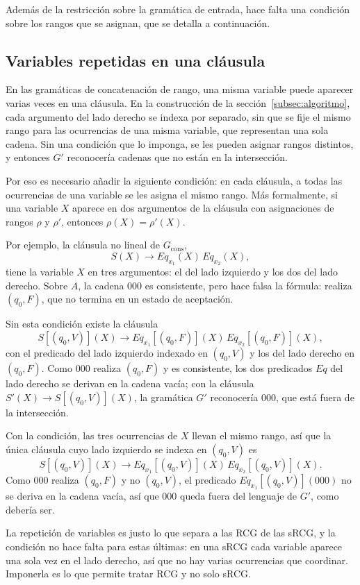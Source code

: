 \documentclass{report}
\theoremstyle{definition}
\theoremstyle{plain}
\begin{document}
Además de la restricción sobre la gramática de entrada, hace falta una
condición sobre los rangos que se asignan, que se detalla a
continuación.

\subsection{Variables repetidas en una cláusula}

En las gramáticas de concatenación de rango, una misma variable puede
aparecer varias veces en una cláusula. En la construcción de la
sección~\ref{subsec:algoritmo}, cada argumento del lado derecho se indexa por
separado,
sin que se fije el mismo rango para las ocurrencias de una misma
variable, que representan una sola cadena.
Sin una condición que lo imponga, se les pueden asignar rangos
distintos, y entonces $G'$ reconocería cadenas que no están en la
intersección.

Por eso es necesario añadir la siguiente condición: en cada cláusula,
a todas las ocurrencias de una variable se les asigna el mismo rango.
Más formalmente, si una variable $X$ aparece en dos argumentos de la
cláusula con asignaciones de rangos $\rho$ y $\rho'$, entonces
$\rho(X) = \rho'(X)$.

Por ejemplo, la cláusula no lineal de $G_{\mathrm{cons}}$,
\[
  S(X) \to Eq_{x_1}(X)\, Eq_{x_2}(X),
\]
tiene la variable $X$ en tres argumentos: el del lado izquierdo y los
dos del lado derecho. Sobre $A$, la cadena $000$ es consistente, pero
hace falsa la fórmula: realiza $(q_0, F)$, que no termina en un estado
de aceptación.

Sin esta condición existe la cláusula
\[
  S[(q_0, V)](X) \to Eq_{x_1}[(q_0, F)](X)\, Eq_{x_2}[(q_0, F)](X),
\]
con el predicado del lado izquierdo indexado en $(q_0, V)$ y los del
lado derecho en $(q_0, F)$. Como $000$ realiza $(q_0, F)$ y es
consistente, los dos predicados $Eq$ del lado derecho se derivan en la
cadena vacía; con la cláusula $S'(X) \to S[(q_0, V)](X)$, la gramática
$G'$ reconocería $000$, que está fuera de la intersección.

Con la condición, las tres ocurrencias de $X$ llevan el mismo rango, así
que la única cláusula cuyo lado izquierdo se indexa en $(q_0, V)$ es
\[
  S[(q_0, V)](X) \to Eq_{x_1}[(q_0, V)](X)\, Eq_{x_2}[(q_0, V)](X).
\]
Como $000$ realiza $(q_0, F)$ y no $(q_0, V)$, el predicado
$Eq_{x_1}[(q_0, V)](000)$ no se deriva en la cadena vacía, así que $000$
queda fuera del lenguaje de $G'$, como debería ser.

La repetición de variables es justo lo que separa a las RCG de las sRCG,
y la condición no hace falta para estas últimas: en una sRCG
cada variable aparece una sola vez en el lado derecho, así que no hay varias
ocurrencias que coordinar. Imponerla es lo que permite tratar RCG y no
solo sRCG.
\end{document}
